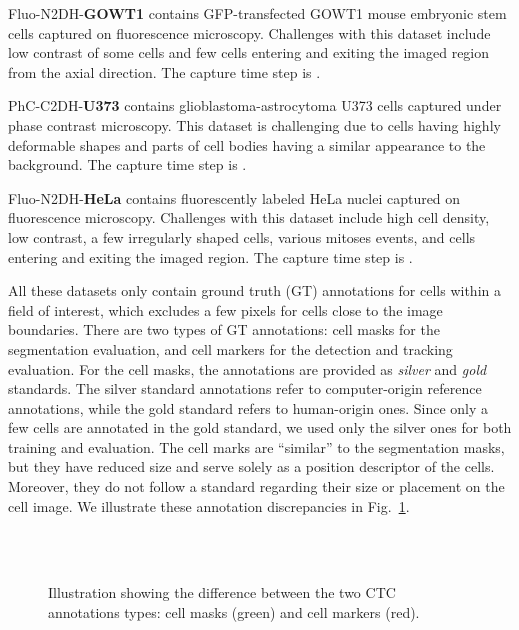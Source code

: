 \documentclass{article}
\begin{document}
Fluo-N2DH-\textbf{GOWT1} contains GFP-transfected GOWT1 mouse embryonic stem cells captured on fluorescence microscopy. Challenges with this dataset include low contrast of some cells and few cells entering and exiting the imaged region from the axial direction. The capture time step is .

PhC-C2DH-\textbf{U373} contains glioblastoma-astrocytoma U373 cells captured under phase contrast microscopy. This dataset is challenging due to cells having highly deformable shapes and parts of cell bodies having a similar appearance to the background. The capture time step is .

Fluo-N2DH-\textbf{HeLa} contains fluorescently labeled HeLa nuclei captured on fluorescence microscopy. Challenges with this dataset include high cell density, low contrast, a few irregularly shaped cells, various mitoses events, and cells entering and exiting the imaged region. The capture time step is .

All these datasets only contain ground truth (GT) annotations for cells within a field of interest, which excludes a few pixels for cells close to the image boundaries. There are two types of GT annotations: cell masks for the segmentation evaluation, and cell markers for the detection and tracking evaluation. For the cell masks, the annotations are provided as \emph{silver} and \emph{gold} standards. The silver standard annotations refer to computer-origin reference annotations, while the gold standard refers to human-origin ones. Since only a few cells are annotated in the gold standard, we used only the silver ones for both training and evaluation. The cell marks are ``similar'' to the segmentation masks, but they have reduced size and serve solely as a position descriptor of the cells. Moreover, they do not follow a standard regarding their size or placement on the cell image. We illustrate these annotation discrepancies in Fig.~\ref{fig:comparsion_masks_marks}.

\begin{figure}[]
\centering
{} ~
 ~
 \vspace{0.1cm} \\
 ~
 ~
\caption[Illustration showing the difference between the two CTC annotations types.]{Illustration showing the difference between the two CTC~\cite{isbi} annotations types: cell masks (green) and cell markers (red).}
\label{fig:comparsion_masks_marks}
\end{figure}
\end{document}
